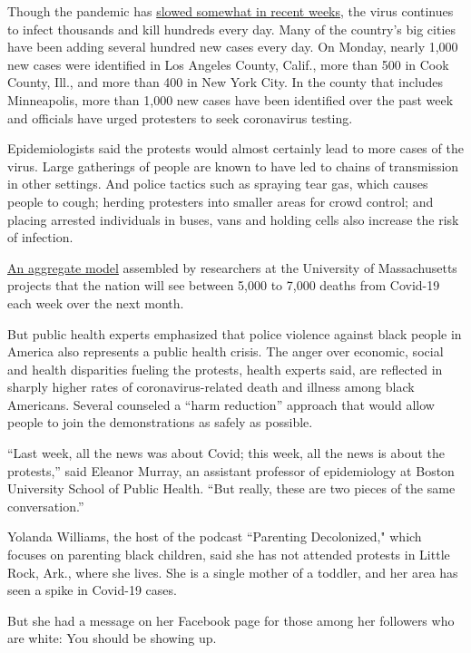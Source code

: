 Though the pandemic has
\href{https://www.nytimes.com/2020/06/01/us/coronavirus-united-states.html}{slowed
somewhat in recent weeks}, the virus continues to infect thousands and
kill hundreds every day. Many of the country's big cities have been
adding several hundred new cases every day. On Monday, nearly 1,000 new
cases were identified in Los Angeles County, Calif., more than 500 in
Cook County, Ill., and more than 400 in New York City. In the county
that includes Minneapolis, more than 1,000 new cases have been
identified over the past week and officials have urged protesters to
seek coronavirus testing.

Epidemiologists said the protests would almost certainly lead to more
cases of the virus. Large gatherings of people are known to have led to
chains of transmission in other settings. And police tactics such as
spraying tear gas, which causes people to cough; herding protesters into
smaller areas for crowd control; and placing arrested individuals in
buses, vans and holding cells also increase the risk of infection.

\href{https://reichlab.io/covid19-forecast-hub/}{An aggregate model}
assembled by researchers at the University of Massachusetts projects
that the nation will see between 5,000 to 7,000 deaths from Covid-19
each week over the next month.

But public health experts emphasized that police violence against black
people in America also represents a public health crisis. The anger over
economic, social and health disparities fueling the protests, health
experts said, are reflected in sharply higher rates of
coronavirus-related death and illness among black Americans. Several
counseled a ``harm reduction'' approach that would allow people to join
the demonstrations as safely as possible.

``Last week, all the news was about Covid; this week, all the news is
about the protests,'' said Eleanor Murray, an assistant professor of
epidemiology at Boston University School of Public Health. ``But really,
these are two pieces of the same conversation.''

Yolanda Williams, the host of the podcast ``Parenting Decolonized,"
which focuses on parenting black children, said she has not attended
protests in Little Rock, Ark., where she lives. She is a single mother
of a toddler, and her area has seen a spike in Covid-19 cases.

But she had a message on her Facebook page for those among her followers
who are white: You should be showing up.

